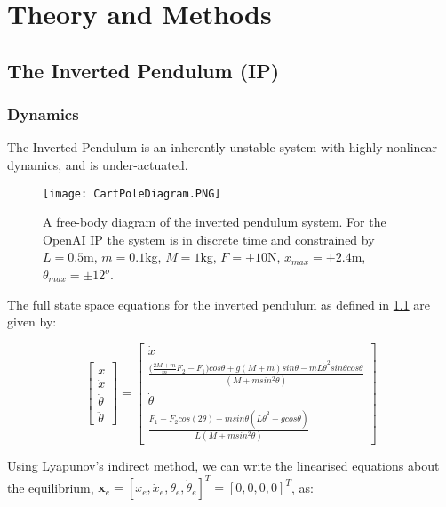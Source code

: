 \documentclass[../main.tex]{subfiles}
\begin{document}
\onlyinsubfile{\tableofcontents{}}

\chapter{Theory and Methods}

\section{The Inverted Pendulum (IP)}

\subsection{Dynamics}
The Inverted Pendulum is an inherently unstable system with highly nonlinear dynamics, and is under-actuated.

\begin{figure}[ht]
    \centering
    \texttt{[image: CartPoleDiagram.PNG]}
    \caption{A free-body diagram of the inverted pendulum system. For the OpenAI IP the system is in discrete time and constrained by $L = 0.5$m, $m=0.1$kg, $M=1$kg, $F=\pm10$N, $x_{max}=\pm 2.4$m, $\theta_{max} = \pm 12^o$.}
    \label{fig:invpen}
\end{figure}

The full state space equations for the inverted pendulum as defined in \cref{fig:invpen} are given by:

\begin{equation}
\begin{bmatrix} \dot{x} \\ \ddot{x} \\ \dot{\theta} \\ \ddot{\theta} \end{bmatrix}  =
\begin{bmatrix} \dot{x} \\ \frac{\big(\frac{2M+m}{m}F_2-F_1\big)cos\theta + g(M+m)sin\theta - mL\dot{\theta}^2 sin\theta cos\theta}{(M + m sin^2\theta)} \\ \dot{\theta} \\ \frac{F_1 - F_2cos(2\theta)+ msin\theta(L\dot{\theta}^2-g cos\theta)}{L(M+m sin^2\theta)} \end{bmatrix}
\end{equation}

Using Lyapunov's indirect method, we can write the linearised equations about the equilibrium, $\boldsymbol{x}_e = [x_e, \dot{x}_e, \theta_e, \dot{\theta}_e]^T = [0, 0, 0, 0]^T$, as:
\end{document}
